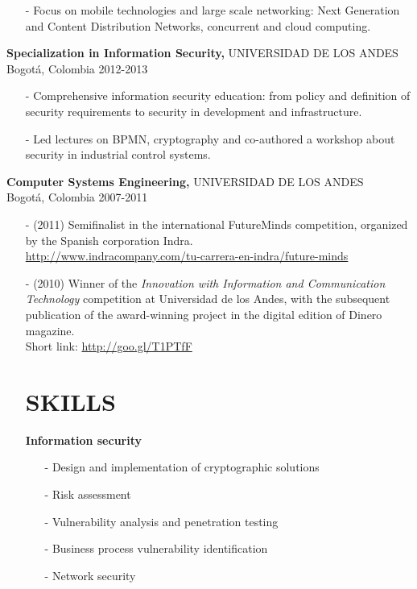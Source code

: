 \documentclass[line,margin]{res}
\begin{document}
\begin{resume}
	\begin{itemize}
		\item[-] Focus on mobile technologies and large scale networking: Next Generation and Content Distribution Networks, concurrent and cloud computing.
	\end{itemize}

{\bf Specialization in Information Security,} UNIVERSIDAD DE LOS ANDES\\
		Bogot\'a, Colombia  2012-2013
	\begin{itemize}
		\item[-] Comprehensive information security education: from policy and definition of security requirements to security in development and infrastructure.
		\item[-] Led lectures on BPMN, cryptography and co-authored a workshop about security in industrial control systems.
	\end{itemize}

{\bf Computer Systems Engineering,} UNIVERSIDAD DE LOS ANDES\\
		Bogot\'a, Colombia  2007-2011
	\begin{itemize}
		\item[-] (2011) Semifinalist in the international FutureMinds competition, organized by the Spanish corporation Indra. \\ \url{http://www.indracompany.com/tu-carrera-en-indra/future-minds}
		\item[-] (2010) Winner of the \emph{Innovation with Information and Communication Technology} competition at Universidad de los Andes, with the subsequent publication of the award-winning project in the digital edition of Dinero magazine.\\  Short link: \url{http://goo.gl/T1PTfF}		
 
\section{SKILLS} 

	{\bf Information security} 
       \begin{itemize}
        \item[-] Design and implementation of cryptographic solutions
		\item[-] Risk assessment
		\item[-] Vulnerability analysis and penetration testing
		\item[-] Business process vulnerability identification
		\item[-] Network security
    \end{itemize}
	

\end{itemize}
\end{resume}
\end{document}
